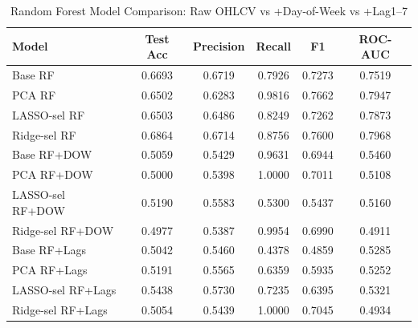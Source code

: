 \begin{table}[htbp]
\centering
\caption{Random Forest Model Comparison: Raw OHLCV vs +Day-of-Week vs +Lag1--7}
\label{tab:base\_rf\_comparison}
\begin{tabular}{lccccc}
\hline
Model & Test Acc & Precision & Recall & F1 & ROC-AUC \\
\hline
Base RF & 0.6693 & 0.6719 & 0.7926 & 0.7273 & 0.7519 \\
PCA RF & 0.6502 & 0.6283 & 0.9816 & 0.7662 & 0.7947 \\
LASSO-sel RF & 0.6503 & 0.6486 & 0.8249 & 0.7262 & 0.7873 \\
Ridge-sel RF & 0.6864 & 0.6714 & 0.8756 & 0.7600 & 0.7968 \\
Base RF+DOW & 0.5059 & 0.5429 & 0.9631 & 0.6944 & 0.5460 \\
PCA RF+DOW & 0.5000 & 0.5398 & 1.0000 & 0.7011 & 0.5108 \\
LASSO-sel RF+DOW & 0.5190 & 0.5583 & 0.5300 & 0.5437 & 0.5160 \\
Ridge-sel RF+DOW & 0.4977 & 0.5387 & 0.9954 & 0.6990 & 0.4911 \\
Base RF+Lags & 0.5042 & 0.5460 & 0.4378 & 0.4859 & 0.5285 \\
PCA RF+Lags & 0.5191 & 0.5565 & 0.6359 & 0.5935 & 0.5252 \\
LASSO-sel RF+Lags & 0.5438 & 0.5730 & 0.7235 & 0.6395 & 0.5321 \\
Ridge-sel RF+Lags & 0.5054 & 0.5439 & 1.0000 & 0.7045 & 0.4934 \\
\hline
\end{tabular}
\end{table}
